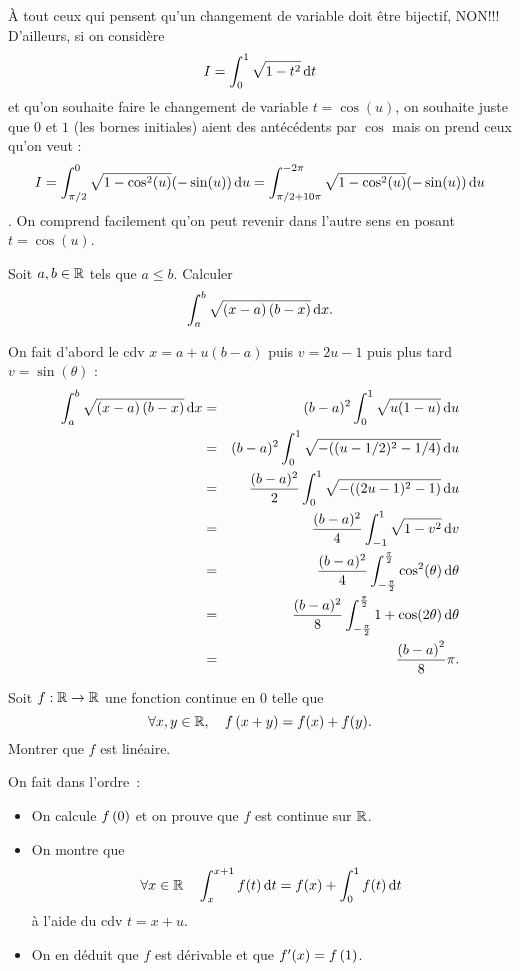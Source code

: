 \documentclass{magnolia}
\begin{document}
\begin{sol}
\`A tout ceux qui pensent qu'un changement de variable doit être bijectif, NON!!! 
D'ailleurs, si on considère $$I=\int_{0}^{1} \sqrt{1-t^2}\,\text{d}t$$ et qu'on souhaite faire le changement de variable $t=\cos(u)$, on souhaite juste que $0$ et $1$ (les bornes initiales) aient des antécédents par $\cos$ mais on prend ceux qu'on veut :
$$I=\int_{\pi/2}^{0} \sqrt{1-\cos^2(u)}(-\sin(u))\,\text{d}u=\int_{\pi/2+10\pi}^{-2\pi} \sqrt{1-\cos^2(u)}(-\sin(u))\,\text{d}u$$. On comprend facilement qu'on peut revenir dans l'autre sens en posant $t=\cos(u)$.
\end{sol}

\begin{exos}
\exo[utile=2] Soit $a,b\in\mathbb{R}$ tels que $a\leq b$. Calculer
  \[\int_{a}^{b} \sqrt{\left(x-a\right)\left(b-x\right)}\,\text{d}x.\]
  \begin{sol}
  On fait d'abord le cdv $x=a+u(b-a)$ puis $v=2u-1$ puis plus tard $v=\sin(\theta)$ :
  \begin{eqnarray*}
  \int_{a}^{b} \sqrt{\left(x-a\right)\left(b-x\right)}\,\text{d}x&=&(b-a)^2\int_{0}^{1} \sqrt{u(1-u)}\,\text{d}u\\
  &=&(b-a)^2\int_{0}^{1} \sqrt{-((u-1/2)^2-1/4)}\,\text{d}u\\
  &=&\frac{(b-a)^2}{2}\int_{0}^{1} \sqrt{-((2u-1)^2-1)}\,\text{d}u\\
  &=&\frac{(b-a)^2}{4}\int_{-1}^{1} \sqrt{1-v^2}\,\text{d}v\\
  &=&\frac{(b-a)^2}{4}\int_{-\frac{\pi}{2}}^{\frac{\pi}{2}} \cos^2(\theta)\,\text{d}\theta\\
  &=&\frac{(b-a)^2}{8}\int_{-\frac{\pi}{2}}^{\frac{\pi}{2}} 1+\cos(2\theta)\,\text{d}\theta\\
  &=&\frac{\left(b-a\right)^2}{8}\pi.
  \end{eqnarray*}
  \end{sol}
\exo[utile=2] Soit $f:\mathbb{R}\to\mathbb{R}$ une fonction continue en $0$ telle
  que
  \[\forall x,y\in\mathbb{R} ,\quad f\left(x+y\right)=f(x)+f(y).\]
  Montrer que $f$ est linéaire.
  \begin{sol}
  On fait dans l'ordre~:
  \begin{itemize}
  \item On calcule $f\left(0\right)$ et on prouve que $f$ est continue sur $\mathbb{R}$.
  \item On montre que
    \[\forall x\in\mathbb{R} \quad \int_{x}^{x+1} f(t)\,\text{d}t=
      f(x)+\int_{0}^{1} f(t)\,\text{d}t\] à l'aide du cdv $t=x+u$.
  \item On en déduit que $f$ est dérivable et que $f'(x)=f\left(1\right)$.
  \end{itemize}
  \end{sol}
\end{exos}
\end{document}
